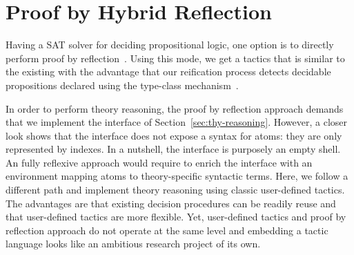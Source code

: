 \documentclass[a4paper,UKenglish,cleveref, autoref, thm-restate]{lipics-v2019}
\begin{document}
\section{Proof by Hybrid Reflection}
\label{sec:reflection}
Having a SAT solver for deciding propositional logic, one option is to
directly perform proof by
reflection~\cite[Chap. 16]{casteran:hal-00344237}. Using this mode, we
get a tactics that is similar to the existing  with the
advantage that our reification process detects decidable propositions
declared using the type-class mechanism~\cite{SozeauO08}.
%

In order to perform theory reasoning, the proof by reflection approach
demands that we implement the interface of
Section~\ref{sec:thy-reasoning}. However, a closer look shows that the
interface does not expose a syntax for atoms: they are only
represented by indexes. In a nutshell, the interface is purposely  an
empty shell. An fully reflexive approach would require to enrich the
interface with an environment mapping atoms to theory-specific
syntactic terms.
%
Here, we follow a different path and implement theory reasoning using
classic user-defined tactics.
%
The advantages are that existing decision procedures can be readily
reuse and that user-defined tactics are more flexible.
%
Yet, user-defined tactics and proof by reflection approach do not
operate at the same level and embedding a tactic language looks
like an ambitious research project of its own. 
\end{document}
